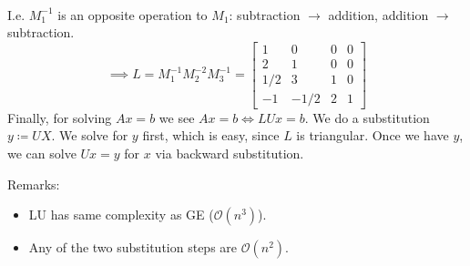 \begin{example}
\begin{align*}
    \end{align*}
    I.e. $M_1^{-1}$ is an opposite operation to $M_1$:
    subtraction $\to$ addition, addition $\to$ subtraction.
    \[
        \implies L = M_1^{-1} M_2^{-2} M_3^{-1} =
        \begin{bmatrix}
            1 & 0 & 0 & 0\\
            2 & 1 & 0 & 0\\
            1/2 & 3 & 1 & 0\\
            -1 & -1/2 & 2 & 1
        \end{bmatrix}
    \]
    Finally, for solving $Ax = b$ we see
    $Ax = b \Longleftrightarrow LUx = b$.
    We do a substitution $y \coloneqq UX$.
    We solve for $y$ first, which is easy, since $L$ is triangular.
    Once we have $y$, we can solve $Ux = y$ for $x$ via backward substitution.
\end{example}

Remarks:
\begin{itemize}
    \item {
        LU has same complexity as GE ($\mathcal{O}(n^3)$).
    }
    \item {
        Any of the two substitution steps are $\mathcal{O}(n^2)$.
    }
\end{itemize}
